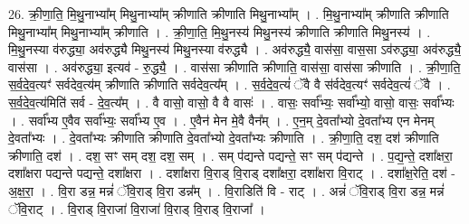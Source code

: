 \documentclass[17pt]{extarticle}
\begin{document}
26. क्री॒णा॒ति॒ मि॒थु॒नाभ्या᳚म् मिथु॒नाभ्या᳚म् क्रीणाति क्रीणाति मिथु॒नाभ्या᳚म् । . मि॒थु॒नाभ्या᳚म् क्रीणाति क्रीणाति मिथु॒नाभ्या᳚म् मिथु॒नाभ्या᳚म् क्रीणाति । . क्री॒णा॒ति॒ मि॒थु॒नस्य॑ मिथु॒नस्य॑ क्रीणाति क्रीणाति मिथु॒नस्य॑ । . मि॒थु॒नस्या व॑रुद्ध्या॒ अव॑रुद्ध्यै मिथु॒नस्य॑ मिथु॒नस्या व॑रुद्ध्यै । . अव॑रुद्ध्यै॒ वास॑सा॒ वास॒सा ऽव॑रुद्ध्या॒ अव॑रुद्ध्यै॒ वास॑सा । . अव॑रुद्ध्या॒ इत्यव॑ - रु॒द्ध्यै॒ । . वास॑सा क्रीणाति क्रीणाति॒ वास॑सा॒ वास॑सा क्रीणाति । . क्री॒णा॒ति॒ स॒र्व॒दे॒व॒त्यꣳ॑ सर्वदेव॒त्य॑म् क्रीणाति क्रीणाति सर्वदेव॒त्य᳚म् । . स॒र्व॒दे॒व॒त्यं॑ ॅवै वै स॑र्वदेव॒त्यꣳ॑ सर्वदेव॒त्यं॑ ॅवै । . स॒र्व॒दे॒व॒त्य॑मिति॑ सर्व - दे॒व॒त्य᳚म् । . वै वासो॒ वासो॒ वै वै वासः॑ । . वासः॒ सर्वा᳚भ्यः॒ सर्वा᳚भ्यो॒ वासो॒ वासः॒ सर्वा᳚भ्यः । . सर्वा᳚भ्य ए॒वैव सर्वा᳚भ्यः॒ सर्वा᳚भ्य ए॒व । . ए॒वैन॑ मेन मे॒वै वैन᳚म् । . ए॒न॒म् दे॒वता᳚भ्यो दे॒वता᳚भ्य एन मेनम् दे॒वता᳚भ्यः । . दे॒वता᳚भ्यः क्रीणाति क्रीणाति दे॒वता᳚भ्यो दे॒वता᳚भ्यः क्रीणाति । . क्री॒णा॒ति॒ दश॒ दश॑ क्रीणाति क्रीणाति॒ दश॑ । . दश॒ सꣳ सम् दश॒ दश॒ सम् । . सम् प॑द्यन्ते पद्यन्ते॒ सꣳ सम् प॑द्यन्ते । . प॒द्य॒न्ते॒ दशा᳚क्षरा॒ दशा᳚क्षरा पद्यन्ते पद्यन्ते॒ दशा᳚क्षरा । . दशा᳚क्षरा वि॒राड् वि॒राड् दशा᳚क्षरा॒ दशा᳚क्षरा वि॒राट् । . दशा᳚क्ष॒रेति॒ दश॑ - अ॒क्ष॒रा॒ । . वि॒रा डन्न॒ मन्नं॑ ॅवि॒राड् वि॒रा डन्न᳚म् । . वि॒राडिति॑ वि - राट् । . अन्नं॑ ॅवि॒राड् वि॒रा डन्न॒ मन्नं॑ ॅवि॒राट् । . वि॒राड् वि॒राजा॑ वि॒राजा॑ वि॒राड् वि॒राड् वि॒राजा᳚ । \newline
\end{document}
